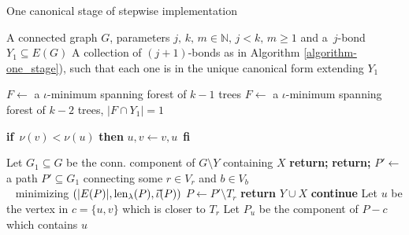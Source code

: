 \begin{algorithm}
	\caption{One canonical stage of stepwise implementation}
	\label{algorithm-can_one_step}
\begin{algorithmic}[1]
	\Require A connected graph $G$, parameters $j,\, k,\, m \in \mathbb{N},\, j < k,\, m \geq 1$ and a~$j$-bond $Y_1 \subseteq E(G)$
	\Ensure A collection of $(j+1)$-bonds as in Algorithm \ref{algorithm-one_stage}), such that each one is in the unique canonical form extending $Y_1$

		\State $F \leftarrow$ a $\iota$-minimum spanning forest of $k-1$ trees
		\Else
		\State $F \leftarrow$ a $\iota$-minimum spanning forest of $k-2$ trees, $\lvert F \cap Y_1 \rvert = 1$
	\EndIf

		\State \textbf{if} $ \, \nu(v) < \nu(u)$ \textbf{then}  $u,v \leftarrow v, u \,$ \textbf{fi}
		\State {}
	\EndFor

	\State Let $G_1 \subseteq G$ be the conn. component of $G \setminus Y$ containing $X$
		\State \textbf{return;}
	\EndIf
		\State \textbf{return;}
	\EndIf
	\State $P' \leftarrow$ a path $P' \subseteq G_1$ connecting some $r \in V_r$ and $b \in V_b$ \\
	\qquad \quad \,\,\, minimizing $(\lvert E(P) \rvert, \operatorname{len}_\lambda(P), \vec{\iota}(P) )$
	\State $P \leftarrow P' \setminus T_r$
		\State \textbf{return} $Y \cup X$ 
	\Else
				\State \textbf{continue}
			\EndIf
			\State Let $u$ be the vertex in $c = \{u,v\}$ which is closer to $T_r$
			\State Let $P_u$ be the component of $P - c$ which contains $u$
			\State {}
		\EndFor
	\EndIf

	\EndProcedure
\end{algorithmic}
\end{algorithm}

\clearpage


